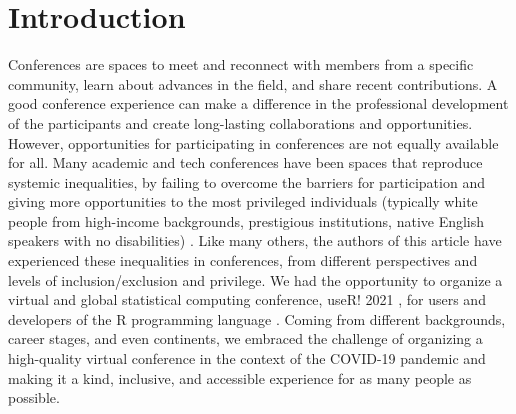 \documentclass[10pt,letterpaper]{article}
\begin{document}

\linenumbers

\section*{Introduction}

Conferences are spaces to meet and reconnect with members from a specific community, learn about advances in the field, and share recent contributions.
A good conference experience can make a difference in the professional development of the participants and create long-lasting collaborations and opportunities. 
However, opportunities for participating in conferences are not equally available for all. 
Many academic and tech conferences have been spaces that reproduce systemic inequalities, by failing to overcome the barriers for participation and giving more opportunities to the most privileged individuals (typically white people from high-income backgrounds, prestigious institutions,  native English speakers with no disabilities) \cite{arendDisparityConferenceRegistration2019, biggsAcademicConferenceChilly2018, depickerRethinkingInclusionDisability2020a, irishIncreasingParticipationUsing2020}.
Like many others, the authors of this article have experienced these inequalities in conferences, from different perspectives and levels of inclusion/exclusion and privilege. 
We had the opportunity to organize a virtual and global statistical computing conference, useR! 2021 \cite{sanchez-tapia_user_2021-2}, for users and developers of the R programming language \cite{r_core_team_2021}.
Coming from different backgrounds, career stages, and even continents, we embraced the challenge of organizing a high-quality virtual conference in the context of the COVID-19 pandemic and making it a kind, inclusive, and accessible experience for as many people as possible.
\end{document}
